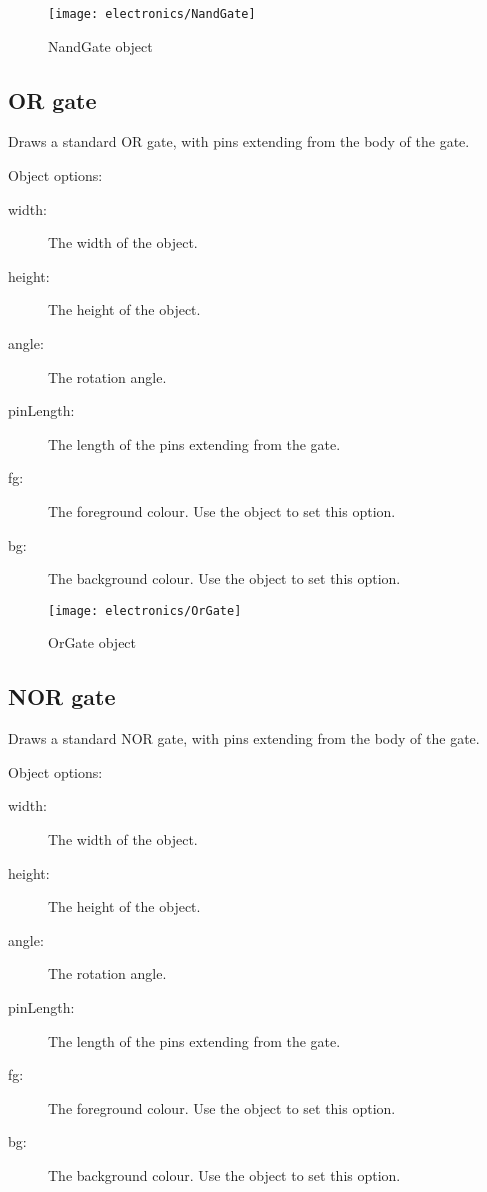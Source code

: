 \begin{figure}[h]
\centerline{\texttt{[image: electronics/NandGate]}}
\caption{NandGate object}
\label{fig:nand_gate}
\end{figure}

\subsection{OR gate}
Draws a standard OR gate, with pins extending from the body of the gate.

Object options:
\begin{description}
\item[width:] The width of the object.
\item[height:] The height of the object.
\item[angle:] The rotation angle.
\item[pinLength:] The length of the pins extending from the gate.
\item[fg:] The foreground colour.  Use the  object to set this
option.
\item[bg:] The background colour.  Use the  object to set this
option.
\end{description}

\begin{figure}[h]
\centerline{\texttt{[image: electronics/OrGate]}}
\caption{OrGate object}
\label{fig:or_gate}
\end{figure}

\subsection{NOR gate}
Draws a standard NOR gate, with pins extending from the body of the gate.

Object options:
\begin{description}
\item[width:] The width of the object.
\item[height:] The height of the object.
\item[angle:] The rotation angle.
\item[pinLength:] The length of the pins extending from the gate.
\item[fg:] The foreground colour.  Use the  object to set this
option.
\item[bg:] The background colour.  Use the  object to set this
option.
\end{description}

